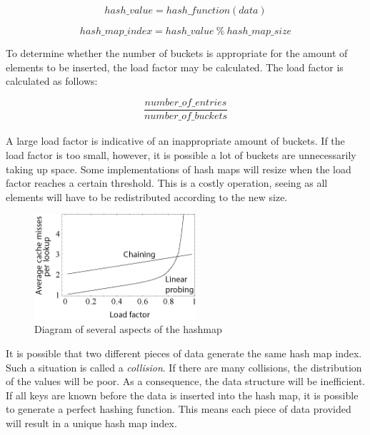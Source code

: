 \documentclass{article}
\begin{document}
{\begin{samepage}
  \begin{equation}
    hash\_value = hash\_function(data)
  \end{equation}
  
  \begin{equation}
    hash\_map\_index = hash\_value \ \% \ hash\_map\_size
  \end{equation}
\end{samepage}

\begin{samepage}
  To determine whether the number of buckets is appropriate for the amount of elements to be inserted,
  the load factor may be calculated. The load factor is calculated as follows:
  
  \begin{equation}
    \frac{number\_of\_entries}{number\_of\_buckets}
  \end{equation}

  \paragraph{}
  A large load factor is indicative of an inappropriate amount of buckets.
  If the load factor is too small, however, it is possible a lot of buckets are unnecessarily taking up space.
  Some implementations of hash maps will resize when the load factor reaches a certain threshold.
  This is a costly operation, seeing as all elements will have to be redistributed according to the new size.
\end{samepage}

\begin{figure}[H]
  \centering
  \includegraphics[width=6cm]{load_factor}
  \caption{Diagram of several aspects of the hashmap}
\end{figure}

It is possible that two different pieces of data generate the same hash map index.
Such a situation is called a {\em collision}. If there are many collisions, the distribution of the values
will be poor. As a consequence, the data structure will be inefficient.
If all keys are known before the data is inserted into the hash map, it is possible to generate a perfect
hashing function. This means each piece of data provided will result in a unique hash map index.

}
\end{document}
